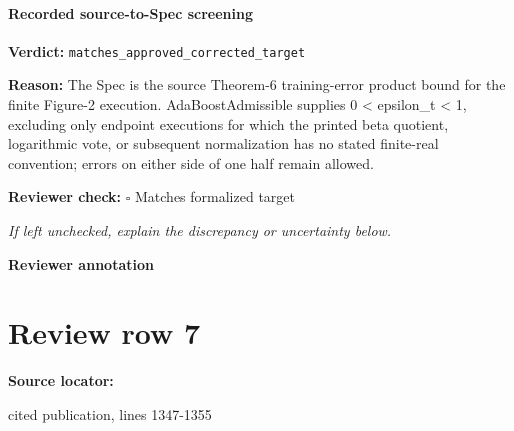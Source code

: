 \documentclass[10pt]{article}
\newcommand{\reviewerbox}{%
  \par\noindent\fbox{\parbox{0.96\linewidth}{\rule{0pt}{0.38in}}}\par
}
\newcommand{\reviewmatch}[1]{%
  \par\noindent\textbf{Reviewer check:} $\square$\; #1\par
  \noindent\emph{If left unchecked, explain the discrepancy or uncertainty below.}\par
}
\begin{document}
\paragraph{Recorded source-to-Spec screening}
\textbf{Verdict:} \texttt{matches\_approved\_corrected\_target}
\\
{\raggedright
\textbf{Reason:} The Spec is the source Theorem-\allowbreak{}6 training-\allowbreak{}error product bound for the finite Figure-\allowbreak{}2 execution.\allowbreak{} AdaBoostAdmissible supplies 0 < epsilon\_\allowbreak{}t < 1, excluding only endpoint executions for which the printed beta quotient, logarithmic vote, or subsequent normalization has no stated finite-\allowbreak{}real convention;\allowbreak{} errors on either side of one half remain allowed.\allowbreak{}
\par}
\reviewmatch{Matches formalized target}
\noindent\textbf{Reviewer annotation}\par
\reviewerbox
\clearpage
\hypertarget{source-claim-7a8193a4706926bf}{}
\section*{Review row 7}
\textbf{Source locator:} {\footnotesize\raggedright cited publication, lines 1347-\allowbreak{}1355\par}
\end{document}
